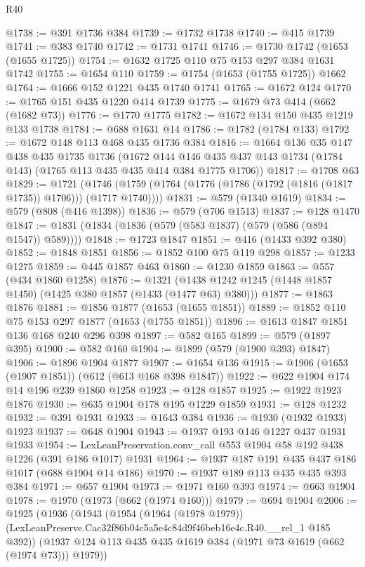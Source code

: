\begin{lexlean}{R40}
\begin{coremodule}
@1738 := @391 @1736 @384
@1739 := @1732 @1738
@1740 := @415 @1739
@1741 := @383 @1740
@1742 := @1731 @1741
@1746 := @1730 @1742 (@1653 (@1655 @1725))
@1754 := @1632 @1725 @110 @75 @153 @297 @384 @1631 @1742
@1755 := @1654 @110
@1759 := @1754 (@1653 (@1755 @1725)) @1662
@1764 := @1666 @152 @1221 @435 @1740 @1741
@1765 := @1672 @124
@1770 := @1765 @151 @435 @1220 @414 @1739
@1775 := @1679 @73 @414 (@662 (@1682 @73))
@1776 := @1770 @1775
@1782 := @1672 @134 @150 @435 @1219 @133 @1738
@1784 := @688 @1631 @14
@1786 := @1782 (@1784 @133)
@1792 := @1672 @148 @113 @468 @435 @1736 @384
@1816 := @1664
    @136
    @35
    @147
    @438
    @435
    @1735
    @1736
    (@1672 @144 @146 @435 @437 @143 @1734 (@1784 @143) (@1765 @113 @435 @435 @414 @384 @1775 @1706))
@1817 := @1708 @63
@1829 := @1721
    (@1746 (@1759 (@1764 (@1776 (@1786 (@1792 (@1816 (@1817 @1735)) @1706))) (@1717 @1740))))
@1831 := @579 (@1340 @1619)
@1834 := @579 (@808 (@416 @1398))
@1836 := @579 (@706 @1513)
@1837 := @128 @1470
@1847 := @1831 (@1834 (@1836 (@579 (@583 @1837) (@579 (@586 (@894 @1547)) @589))))
@1848 := @1723 @1847
@1851 := @416 (@1433 @392 @380)
@1852 := @1848 @1851
@1856 := @1852 @100 @75 @119 @298
@1857 := @1233 @1275
@1859 := @445 @1857 @463
@1860 := @1230 @1859
@1863 := @557 (@434 @1860 @1258)
@1876 := @1321 (@1438 @1242 @1245 (@1448 @1857 @1450) (@1425 @380 @1857 (@1433 (@1477 @63) @380)))
@1877 := @1863 @1876
@1881 := @1856 @1877 (@1653 (@1655 @1851))
@1889 := @1852 @110 @75 @153 @297 @1877 (@1653 (@1755 @1851))
@1896 := @1613 @1847 @1851 @136 @168 @240 @296 @398
@1897 := @582 @165
@1899 := @579 (@1897 @395)
@1900 := @582 @160
@1904 := @1899 (@579 (@1900 @393) @1847)
@1906 := @1896 @1904 @1877
@1907 := @1654 @136
@1915 := @1906 (@1653 (@1907 @1851)) (@612 (@613 @168 @398 @1847))
@1922 := @622 @1904 @174 @14 @196 @239 @1860 @1258
@1923 := @128 @1857
@1925 := @1922 @1923 @1876
@1930 := @635 @1904 @178 @195 @1229 @1859
@1931 := @128 @1232
@1932 := @391 @1931
@1933 := @1643 @384
@1936 := @1930 (@1932 @1933) @1923
@1937 := @648 @1904
@1943 := @1937 @193 @146 @1227 @437 @1931 @1933
@1954 := LexLeanPreservation.conv_call @553 @1904 @58 @192 @438 @1226 (@391 @186 @1017) @1931
@1964 := @1937 @187 @191 @435 @437 @186 @1017 (@688 @1904 @14 @186)
@1970 := @1937 @189 @113 @435 @435 @393 @384
@1971 := @657 @1904
@1973 := @1971 @160 @393
@1974 := @663 @1904
@1978 := @1970 (@1973 (@662 (@1974 @160)))
@1979 := @694 @1904
@2006 := @1925
    (@1936
      (@1943
        (@1954
          (@1964 (@1978 @1979))
          (LexLeanPreserve.Cac32f86b04c5a5e4c84d9f46beb16e4c.R40.__rel_1 @185 @392))
        (@1937 @124 @113 @435 @435 @1619 @384 (@1971 @73 @1619 (@662 (@1974 @73))) @1979))

\end{coremodule}
\end{lexlean}

